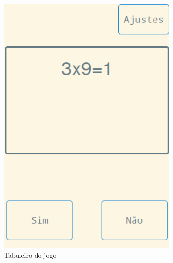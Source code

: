 \documentclass[
12pt,
a4paper,
portuges,
draft
]{report}
\begin{document}
\begin{figure}
    \centering
    \includegraphics[width=0.8\textwidth,natwidth=610,natheight=642]{board.png}
	\caption{Tabuleiro do jogo}
\end{figure}
\end{document}
